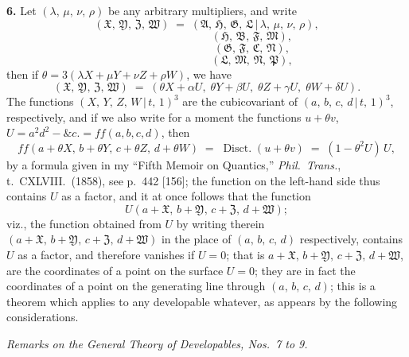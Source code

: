 \documentclass[11pt,a4paper]{article}
\providecommand{\mid}{\,|\,}
\providecommand{\Disct}{\operatorname{Disct.}}
\begin{document}
\textbf{6.} Let $(\lambda,\,\mu,\,\nu,\,\rho)$ be any arbitrary multipliers, and write
\[
(\mathfrak{X},\,\mathfrak{Y},\,\mathfrak{Z},\,\mathfrak{W}) \;=\; (\mathfrak{A},\,\mathfrak{H},\,\mathfrak{G},\,\mathfrak{L}\mid \lambda,\,\mu,\,\nu,\,\rho),
\]
\[
\phantom{(\mathfrak{X},\,\mathfrak{Y},\,\mathfrak{Z},\,\mathfrak{W}) = }(\mathfrak{H},\,\mathfrak{B},\,\mathfrak{F},\,\mathfrak{M}),
\]
\[
\phantom{(\mathfrak{X},\,\mathfrak{Y},\,\mathfrak{Z},\,\mathfrak{W}) = }(\mathfrak{G},\,\mathfrak{F},\,\mathfrak{C},\,\mathfrak{N}),
\]
\[
\phantom{(\mathfrak{X},\,\mathfrak{Y},\,\mathfrak{Z},\,\mathfrak{W}) = }(\mathfrak{L},\,\mathfrak{M},\,\mathfrak{N},\,\mathfrak{P}),
\]
then if $\theta = 3(\lambda X + \mu Y + \nu Z + \rho W)$, we have
\[
(\mathfrak{X},\,\mathfrak{Y},\,\mathfrak{Z},\,\mathfrak{W}) \;=\; (\theta X + \alpha U,\;\theta Y + \beta U,\;\theta Z + \gamma U,\;\theta W + \delta U).
\]
The functions $(X,\,Y,\,Z,\,W\mid t,\,1)^3$ are the cubicovariant of $(a,\,b,\,c,\,d\mid t,\,1)^3$, respectively, and if we also write for a moment the functions $u + \theta v$, $U = a^2 d^2 - \&c. = \mathit{ff}(a,b,c,d)$, then
\[
\mathit{ff}(a + \theta X,\,b + \theta Y,\,c + \theta Z,\,d + \theta W) \;=\; \Disct(u + \theta v) \;=\; (1 - \theta^2 U)\,U,
\]
by a formula given in my ``Fifth Memoir on Quantics,'' \textit{Phil.\ Trans.}, t.~CXLVIII.\ (1858), see p.~442 [156]; the function on the left-hand side thus contains $U$ as a factor, and it at once follows that the function
\[
U(a + \mathfrak{X},\,b + \mathfrak{Y},\,c + \mathfrak{Z},\,d + \mathfrak{W});
\]
viz., the function obtained from $U$ by writing therein $(a + \mathfrak{X},\,b + \mathfrak{Y},\,c + \mathfrak{Z},\,d + \mathfrak{W})$ in the place of $(a,\,b,\,c,\,d)$ respectively, contains $U$ as a factor, and therefore vanishes if $U = 0$; that is $a + \mathfrak{X},\,b + \mathfrak{Y},\,c + \mathfrak{Z},\,d + \mathfrak{W}$, are the coordinates of a point on the surface $U = 0$; they are in fact the coordinates of a point on the generating line through $(a,\,b,\,c,\,d)$; this is a theorem which applies to any developable whatever, as appears by the following considerations.

\bigskip

\begin{center}
\textit{Remarks on the General Theory of Developables, Nos.\ 7 to 9.}
\end{center}
\end{document}
